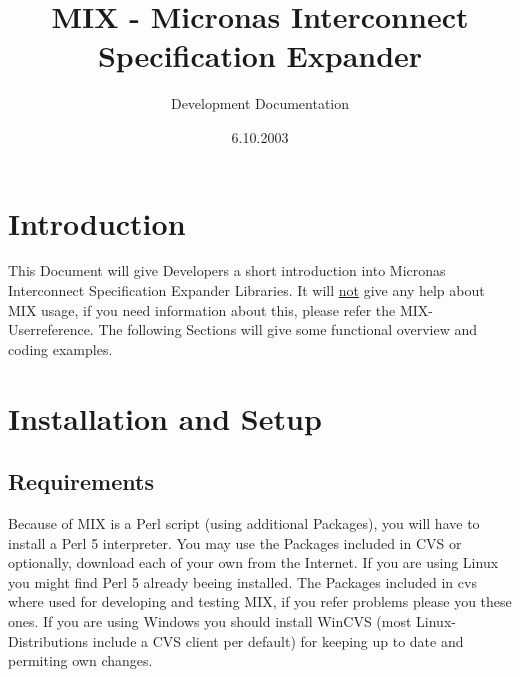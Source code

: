 \documentclass[a4paper,12pt]{article}
\title{MIX - Micronas Interconnect Specification Expander}
\author{Development Documentation}
\date{6.10.2003}
\begin{document}

\maketitle
\newpage

\tableofcontents
\newpage


\section{Introduction}
This Document will give Developers a short introduction into Micronas Interconnect Specification Expander Libraries. It will \underline{not} give any help about MIX usage, if you need information about this, please refer the MIX-Userreference. The following Sections will give some functional overview and coding examples.


\section{Installation and Setup}
\subsection{Requirements}
Because of MIX is a Perl script (using additional Packages), you will have to install a Perl 5 interpreter. You may use the Packages included in CVS or optionally, download each of your own from the Internet. If you are using Linux you might find Perl 5 already beeing installed. The Packages included in cvs where used for developing and testing MIX, if you refer problems please you these ones. If you are using Windows you should install WinCVS (most Linux-Distributions include a CVS client per default) for keeping up to date and permiting own changes.
\end{document}
